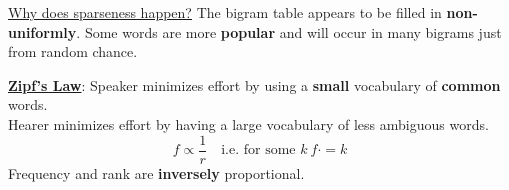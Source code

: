 \documentclass{ainote}
\begin{document}
\underline{Why does sparseness happen?}
\spskip
The bigram table appears to be filled in \textbf{non-uniformly}. Some words are more \textbf{popular} and will occur in many bigrams just from random chance.

\begin{info}
    \textbf{\underline{Zipf's Law}}:
    \spskip
    Speaker minimizes effort by using a \textbf{small} vocabulary of \textbf{common} words.\\
    Hearer minimizes effort by having a large vocabulary of less ambiguous words.
    \begin{equation*}
        f \propto \frac{1}{r}\quad \text{i.e. for some $k$}\ f\cdot = k
    \end{equation*}
    Frequency and rank are \textbf{inversely} proportional.
\end{info}
\end{document}
